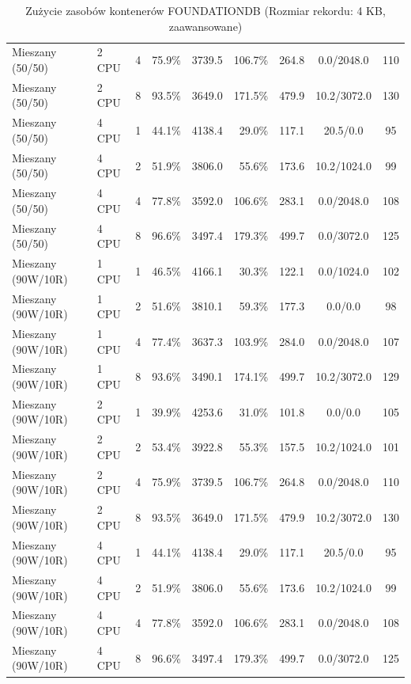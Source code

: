 \begin{table}[ht]
{\begin{tabular}{llcrrrrcc}
Mieszany (50/50) & 2 CPU & 4 & 75.9\% & 3739.5 & 106.7\% & 264.8 & 0.0/2048.0 & 110 \\
Mieszany (50/50) & 2 CPU & 8 & 93.5\% & 3649.0 & 171.5\% & 479.9 & 10.2/3072.0 & 130 \\
Mieszany (50/50) & 4 CPU & 1 & 44.1\% & 4138.4 & 29.0\% & 117.1 & 20.5/0.0 & 95 \\
Mieszany (50/50) & 4 CPU & 2 & 51.9\% & 3806.0 & 55.6\% & 173.6 & 10.2/1024.0 & 99 \\
Mieszany (50/50) & 4 CPU & 4 & 77.8\% & 3592.0 & 106.6\% & 283.1 & 0.0/2048.0 & 108 \\
Mieszany (50/50) & 4 CPU & 8 & 96.6\% & 3497.4 & 179.3\% & 499.7 & 0.0/3072.0 & 125 \\
Mieszany (90W/10R) & 1 CPU & 1 & 46.5\% & 4166.1 & 30.3\% & 122.1 & 0.0/1024.0 & 102 \\
Mieszany (90W/10R) & 1 CPU & 2 & 51.6\% & 3810.1 & 59.3\% & 177.3 & 0.0/0.0 & 98 \\
Mieszany (90W/10R) & 1 CPU & 4 & 77.4\% & 3637.3 & 103.9\% & 284.0 & 0.0/2048.0 & 107 \\
Mieszany (90W/10R) & 1 CPU & 8 & 93.6\% & 3490.1 & 174.1\% & 499.7 & 10.2/3072.0 & 129 \\
Mieszany (90W/10R) & 2 CPU & 1 & 39.9\% & 4253.6 & 31.0\% & 101.8 & 0.0/0.0 & 105 \\
Mieszany (90W/10R) & 2 CPU & 2 & 53.4\% & 3922.8 & 55.3\% & 157.5 & 10.2/1024.0 & 101 \\
Mieszany (90W/10R) & 2 CPU & 4 & 75.9\% & 3739.5 & 106.7\% & 264.8 & 0.0/2048.0 & 110 \\
Mieszany (90W/10R) & 2 CPU & 8 & 93.5\% & 3649.0 & 171.5\% & 479.9 & 10.2/3072.0 & 130 \\
Mieszany (90W/10R) & 4 CPU & 1 & 44.1\% & 4138.4 & 29.0\% & 117.1 & 20.5/0.0 & 95 \\
Mieszany (90W/10R) & 4 CPU & 2 & 51.9\% & 3806.0 & 55.6\% & 173.6 & 10.2/1024.0 & 99 \\
Mieszany (90W/10R) & 4 CPU & 4 & 77.8\% & 3592.0 & 106.6\% & 283.1 & 0.0/2048.0 & 108 \\
Mieszany (90W/10R) & 4 CPU & 8 & 96.6\% & 3497.4 & 179.3\% & 499.7 & 0.0/3072.0 & 125 \\
\bottomrule
\end{tabular}%
}
\caption{Zużycie zasobów kontenerów FOUNDATIONDB (Rozmiar rekordu: 4 KB, zaawansowane)}
\label{tab:resources_foundationdb_medium_0}
\end{table}
